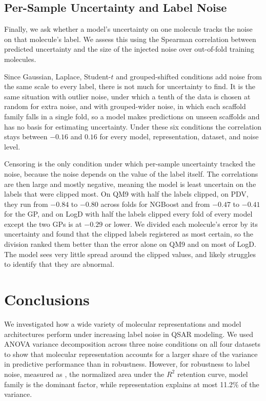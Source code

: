 \subsection{Per-Sample Uncertainty and Label Noise}\label{sec:uq_per_sample}

Finally, we ask whether a model's uncertainty on one molecule tracks the noise on that molecule's label. We assess this using the Spearman correlation between predicted uncertainty and the size of the injected noise over out-of-fold training molecules.

Since Gaussian, Laplace, Student-$t$ and grouped-shifted conditions add noise from the same scale to every label, there is not much for uncertainty to find. It is the same situation with outlier noise, under which a tenth of the data is chosen at random for extra noise, and with grouped-wider noise, in which each scaffold family falls in a single fold, so a model makes predictions on unseen scaffolds and has no basis for estimating uncertainty. Under these six conditions the correlation stays between $-0.16$ and $0.16$ for every model, representation, dataset, and noise level.

Censoring is the only condition under which per-sample uncertainty tracked the noise, because the noise depends on the value of the label itself. The correlations are then large and mostly negative, meaning the model is least uncertain on the labels that were clipped most. On QM9 with half the labels clipped, on PDV, they run from $-0.84$ to $-0.80$ across folds for NGBoost and from $-0.47$ to $-0.41$ for the GP, and on LogD with half the labels clipped every fold of every model except the two GPs is at $-0.29$ or lower. We divided each molecule's error by its uncertainty and found that the clipped labels registered as most certain, so the division ranked them better than the error alone on QM9 and on most of LogD. The model sees very little spread around the clipped values, and likely struggles to identify that they are abnormal.

\section{Conclusions}

We investigated how a wide variety of molecular representations and model architectures perform under increasing label noise in QSAR modeling. We used ANOVA variance decomposition across three noise conditions on all four datasets to show that molecular representation accounts for a larger share of the variance in predictive performance than in robustness. However, for robustness to label noise, measured as \aucnorm, the normalized area under the $R^2$ retention curve, model family is the dominant factor, while representation explains at most 11.2\% of the variance.

